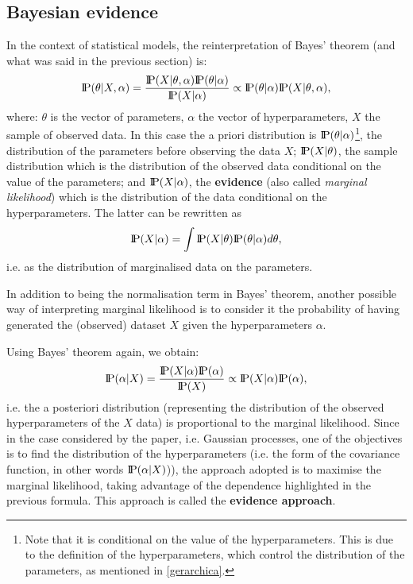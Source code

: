 \subsection{Bayesian evidence}\label{evidenzaBayesiana}
In the context of statistical models, the reinterpretation of Bayes' theorem (and what was said in the previous section) is:
\[
\text{I\kern-0.18em P}(\theta | X, \alpha) = \frac{\text{I\kern-0.18em P}(X|\theta, \alpha)\text{I\kern-0.18em P}(\theta | \alpha)}{\text{I\kern-0.18em P}(X|\alpha)}\propto \text{I\kern-0.18em P}(\theta | \alpha) \text{I\kern-0.18em P}(X|\theta, \alpha),
\]
where: $\theta$ is the vector of parameters, $\alpha$ the vector of hyperparameters, $X$ the sample of observed data. In this case the a priori distribution is $\text{I\kern-0.18em P}(\theta|\alpha)$\footnote{ Note that it is conditional on the value of the hyperparameters. This is due to the definition of the hyperparameters, which control the distribution of the parameters, as mentioned in \ref{gerarchica}. }, the distribution of the parameters before observing the data $X$; $\text{I\kern-0.18em P}(X|\theta)$, the sample distribution which is the distribution of the observed data conditional on the value of the parameters; and $\text{I\kern-0.18em P}(X|\alpha)$, the \textbf{evidence} (also called \textit{marginal likelihood}) which is the distribution of the data conditional on the hyperparameters. The latter can be rewritten as
\[
\text{I\kern-0.18em P}(X|\alpha) = \int \text{I\kern-0.18em P}(X|\theta)\text{I\kern-0.18em P}(\theta | \alpha)d\theta,
\]
i.e. as the distribution of marginalised data on the parameters.

In addition to being the normalisation term in Bayes' theorem, another possible way of interpreting marginal likelihood is to consider it the probability of having generated the (observed) dataset $X$ given the hyperparameters $\alpha$.

Using Bayes' theorem again, we obtain:
\[
\text{I\kern-0.18em P}(\alpha |X) = \frac{\text{I\kern-0.18em P}(X|\alpha)\text{I\kern-0.18em P}(\alpha)}{\text{I\kern-0.18em P}(X)}\propto \text{I\kern-0.18em P}(X|\alpha) \text{I\kern-0.18em P}(\alpha),
\]
i.e. the a posteriori distribution (representing the distribution of the observed hyperparameters of the $X$ data) is proportional to the marginal likelihood. Since in the case considered by the paper, i.e. Gaussian processes, one of the objectives is to find the distribution of the hyperparameters (i.e. the form of the covariance function, in other words $\text{I\kern-0.18em P}(\alpha|X)$)), the approach adopted is to maximise the marginal likelihood, taking advantage of the dependence highlighted in the previous formula. This approach is called the \textbf{evidence approach}.

\newpage

